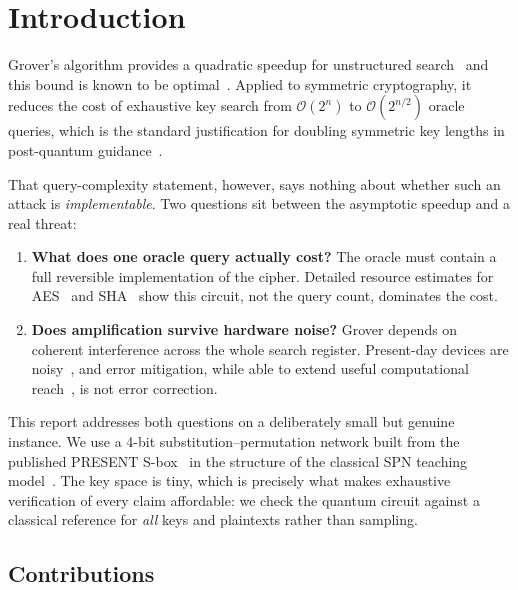\documentclass[11pt,a4paper]{article}
\newcommand{\bigO}[1]{\mathcal{O}\!\left(#1\right)}
\begin{document}
\tableofcontents
\bigskip

\section{Introduction}

Grover's algorithm provides a quadratic speedup for unstructured
search~\citep{grover1996} and this bound is known to be
optimal~\citep{bennett1997,zalka1999}. Applied to symmetric cryptography, it
reduces the cost of exhaustive key search from $\bigO{2^n}$ to $\bigO{2^{n/2}}$
oracle queries, which is the standard justification for doubling symmetric key
lengths in post-quantum guidance~\citep{nistir8105,bernstein2017}.

That query-complexity statement, however, says nothing about whether such an
attack is \emph{implementable}. Two questions sit between the asymptotic
speedup and a real threat:

\begin{enumerate}
  \item \textbf{What does one oracle query actually cost?} The oracle must
        contain a full reversible implementation of the cipher. Detailed
        resource estimates for AES~\citep{grassl2016,jaques2020} and
        SHA~\citep{amy2016} show this circuit, not the query count, dominates
        the cost.
  \item \textbf{Does amplification survive hardware noise?} Grover depends on
        coherent interference across the whole search register. Present-day
        devices are noisy~\citep{preskill2018}, and error mitigation, while
        able to extend useful computational reach~\citep{kandala2019,cai2023},
        is not error correction.
\end{enumerate}

This report addresses both questions on a deliberately small but genuine
instance. We use a 4-bit substitution--permutation network built from the
published PRESENT S-box~\citep{bogdanov2007} in the structure of the classical
SPN teaching model~\citep{heys2002}. The key space is tiny, which is precisely
what makes exhaustive verification of every claim affordable: we check the
quantum circuit against a classical reference for \emph{all} keys and
plaintexts rather than sampling.

\subsection{Contributions}
\end{document}
